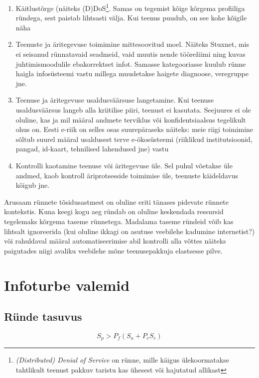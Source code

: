 \documentclass{tufte-book}
\begin{document}
\begin{enumerate}
	\item Käitlustõrge (näiteks (D)DoS\footnote{\emph{(Distributed) Denial of Service} on rünne, mille käigus ülekoormatakse tahtlikult teenust pakkuv taristu kas ühesest või hajutatud allikast}. Samas on tegemist kõige kõrgema profiiliga ründega, sest paistab lihtsasti välja. Kui teenus puudub, on see kohe kõigile näha
	\item Teenuste ja äritegevuse toimimine mittesoovitud moel. Näiteks Stuxnet, mis ei seisanud rünnatavaid seadmeid, vaid muutis nende tööre\v{z}iimi ning kuvas juhtimismoodulile ebakorrektset infot. Samasse kategooriasse kuulub rünne haigla infosüsteemi vastu millega muudetakse haigete diagnoose, veregruppe jne. 
	\item Teenuse ja äritegevuse usaldusväärsuse langetamine. Kui teenuse usaldusväärsus langeb alla kriitilise piiri, teenust ei kasutata. Seejuures ei ole oluline, kas ja mil määral andmete terviklus või konfidentsiaalsus tegelikult ohus on. Eesti e-riik on selles osas suurepäraseks näiteks: meie riigi toimimine sõltub suurel määral usaldusest terve e-ökosüsteemi (riiklikud institutsioonid, pangad, id-kaart, tehnilised lahendused jne) vastu 
	\item Kontrolli kaotamine teenuse või äritegevuse üle. Sel puhul võetakse üle andmed, kaob kontroll äriprotsesside toimimise üle, teenuste käideldavus kõigub jne.
\end{enumerate}

Arusaam rünnete tõsidusastmest on oluline eriti tänases pidevate rünnete kontekstis. Kuna keegi kogu aeg ründab on oluline keskendada ressursid tegelemaks kõrgema taseme rünnetega. Madalama taseme ründeid võib kas lihtsalt ignoreerida (kui oluline ikkagi on asutuse veebilehe kadumine internetist?) või rahuldaval määral automatiseerimise abil kontrolli alla võttes näiteks paigutades niigi avaliku veebilehe mõne teenusepakkuja elastsesse pilve.

\section{Infoturbe valemid} 
\label{sec:valemid}
\subsection{Ründe tasuvus}
\begin{equation}
		S_p>P_f(S_a + P_c S_c)
		\label{eq:tasuvus}
\end{equation}
\end{document}
